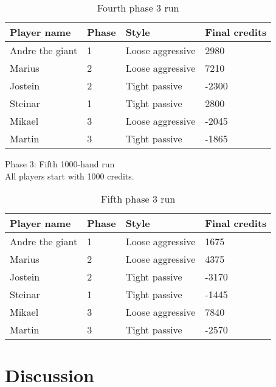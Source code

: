 \documentclass[a4paper, 12pt]{article}
\begin{document}
\begin{table}[H]
	\begin{center}
		\begin{tabular}{|l|l|l| p{6cm} |}
		\hline
		\textbf{Player name} & \textbf{Phase} & \textbf{Style} & \textbf{Final credits} \\
		\hline
		Andre the giant & 1 & Loose aggressive & 2980 \\
		\hline
		Marius & 2 & Loose aggressive & 7210 \\
		\hline
		Jostein & 2 & Tight passive & -2300 \\
		\hline
		Steinar & 1 & Tight passive & 2800 \\
		\hline
		Mikael & 3 & Loose aggressive & -2045 \\
		\hline
		Martin & 3 & Tight passive & -1865 \\
		\hline
		\end{tabular}
	\end{center}
	\caption{Fourth phase 3 run}
\end{table}

\begin{center}
	{ \Large Phase 3: Fifth 1000-hand run } \\
	All players start with 1000 credits.
\end{center}

\begin{table}[H]
	\begin{center}
		\begin{tabular}{|l|l|l| p{6cm} |}
		\hline
		\textbf{Player name} & \textbf{Phase} & \textbf{Style} & \textbf{Final credits} \\
		\hline
		Andre the giant & 1 & Loose aggressive & 1675 \\
		\hline
		Marius & 2 & Loose aggressive & 4375 \\
		\hline
		Jostein & 2 & Tight passive & -3170 \\
		\hline
		Steinar & 1 & Tight passive & -1445 \\
		\hline
		Mikael & 3 & Loose aggressive & 7840 \\
		\hline
		Martin & 3 & Tight passive & -2570 \\
		\hline
		\end{tabular}
	\end{center}
	\caption{Fifth phase 3 run}
\end{table}

\section{Discussion}
\end{document}
